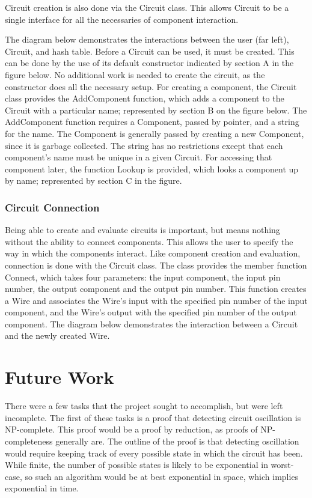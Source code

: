 \documentclass{article}
\begin{document}
Circuit creation is also done via the Circuit class. This allows Circuit to be a single interface for all the necessaries of component interaction.

The diagram below demonstrates the interactions between the user (far left), Circuit, and hash table. Before a Circuit can be used, it must be created. This can be done by the use of its default constructor indicated by section A in the figure below. No additional work is needed to create the circuit, as the constructor does all the necessary setup. For creating a component, the Circuit class provides the AddComponent function, which adds a component to the Circuit with a particular name; represented by section B on the figure below. The AddComponent function requires a Component, passed by pointer, and a string for the name. The Component is generally passed by creating a new Component, since it is garbage collected. The string has no restrictions except that each component’s name must be unique in a given Circuit. For accessing that component later, the function Lookup is provided, which looks a component up by name; represented by section C in the figure.


\subsubsection{Circuit Connection}

Being able to create and evaluate circuits is important, but means nothing without the ability to connect components. This allows the user to specify the way in which the components interact. Like component creation and evaluation, connection is done with the Circuit class. The class provides the member function Connect, which takes four parameters: the input component, the input pin number, the output component and the output pin number. This function creates a Wire and associates the Wire’s input with the specified pin number of the input component, and the Wire’s output with the specified pin number of the output component. The diagram below demonstrates the interaction between a Circuit and the newly created Wire.


\section{Future Work}

There were a few tasks that the project sought to accomplish, but were left incomplete. The first of these tasks is a proof that detecting circuit oscillation is NP-complete. This proof would be a proof by reduction, as proofs of NP-completeness generally are. The outline of the proof is that detecting oscillation would require keeping track of every possible state in which the circuit has been. While finite, the number of possible states is likely to be exponential in worst-case, so such an algorithm would be at best exponential in space, which implies exponential in time.
\end{document}
